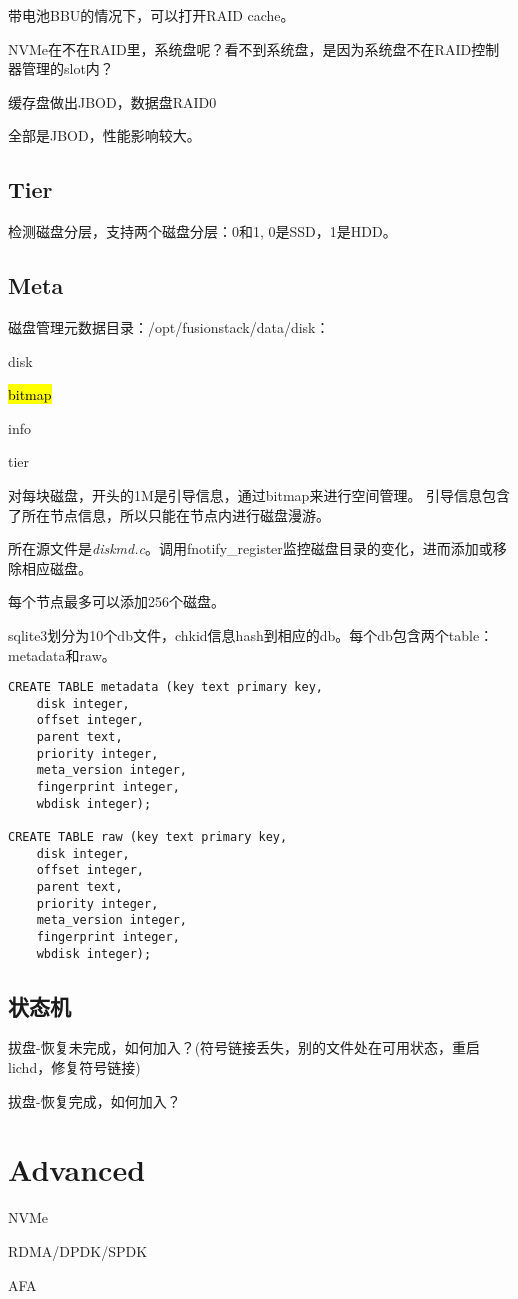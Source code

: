 带电池BBU的情况下，可以打开RAID cache。

NVMe在不在RAID里，系统盘呢？看不到系统盘，是因为系统盘不在RAID控制器管理的slot内？

缓存盘做出JBOD，数据盘RAID0

全部是JBOD，性能影响较大。

\subsection{Tier}

检测磁盘分层，支持两个磁盘分层：0和1, 0是SSD，1是HDD。

\subsection{Meta}

磁盘管理元数据目录：/opt/fusionstack/data/disk：
\begin{compactitem}
\item disk
\item \hl{bitmap}
\item info
\item tier
\end{compactitem}

对每块磁盘，开头的1M是引导信息，通过bitmap来进行空间管理。
引导信息包含了所在节点信息，所以只能在节点内进行磁盘漫游。

所在源文件是\emph{diskmd.c}。调用fnotify\_register监控磁盘目录的变化，进而添加或移除相应磁盘。

每个节点最多可以添加256个磁盘。

sqlite3划分为10个db文件，chkid信息hash到相应的db。每个db包含两个table：metadata和raw。

\begin{lstlisting}[frame=single]
CREATE TABLE metadata (key text primary key, 
    disk integer, 
    offset integer, 
    parent text, 
    priority integer, 
    meta_version integer, 
    fingerprint integer, 
    wbdisk integer);

CREATE TABLE raw (key text primary key, 
    disk integer, 
    offset integer, 
    parent text, 
    priority integer, 
    meta_version integer, 
    fingerprint integer, 
    wbdisk integer);
\end{lstlisting}

\subsection{状态机}

拔盘-恢复未完成，如何加入？(符号链接丢失，别的文件处在可用状态，重启lichd，修复符号链接)

拔盘-恢复完成，如何加入？

\section{Advanced}

NVMe

RDMA/DPDK/SPDK

AFA
